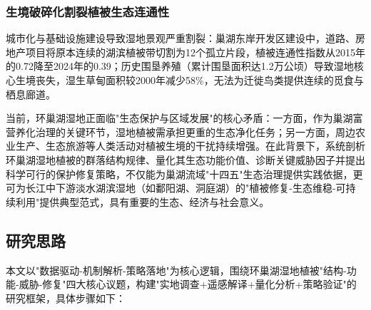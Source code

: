 \subsubsection{生境破碎化割裂植被生态连通性}
城市化与基础设施建设导致湿地景观严重割裂：巢湖东岸开发区建设中，道路、房地产项目将原本连续的湖滨植被带切割为12个孤立片段，植被连通性指数从2015年的0.72降至2024年的0.39；历史围垦养殖（累计围垦面积达1.2万公顷）导致湿地核心生境丧失，湿生草甸面积较2000年减少58\%\cite{zhou2024}，无法为迁徙鸟类提供连续的觅食与栖息廊道。

当前，环巢湖湿地正面临"生态保护与区域发展"的核心矛盾：一方面，作为巢湖富营养化治理的关键环节，湿地植被需承担更重的生态净化任务；另一方面，周边农业生产、生态旅游等人类活动对植被生境的干扰持续增强。在此背景下，系统剖析环巢湖湿地植被的群落结构规律、量化其生态功能价值、诊断关键威胁因子并提出科学可行的保护修复策略，不仅能为巢湖流域"十四五"生态治理提供实践依据，更可为长江中下游淡水湖滨湿地（如鄱阳湖、洞庭湖）的"植被修复-生态维稳-可持续利用"提供典型范式，具有重要的生态、经济与社会意义。

\subsection{研究思路}
本文以"数据驱动-机制解析-策略落地"为核心逻辑，围绕环巢湖湿地植被"结构-功能-威胁-修复"四大核心议题，构建"实地调查+遥感解译+量化分析+策略验证"的研究框架，具体步骤如下：
